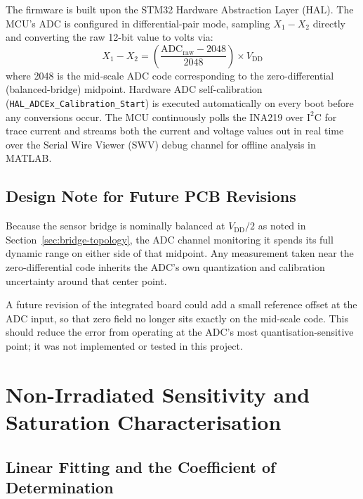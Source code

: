 \documentclass[12pt,a4paper]{article}
\begin{document}
The firmware is built upon the STM32 Hardware Abstraction Layer (HAL). The MCU's ADC is configured in differential-pair mode, sampling \(X_1 - X_2\) directly and converting the raw 12-bit value to volts via:
\begin{equation}
X_1 - X_2 = \left( \frac{\text{ADC}_{\text{raw}} - 2048}{2048} \right) \times V_{\text{DD}}
\label{eq:adcconv}
\end{equation}
where 2048 is the mid-scale ADC code corresponding to the zero-differential (balanced-bridge) midpoint. Hardware ADC self-calibration (\texttt{HAL\_ADCEx\_Calibration\_Start}) is executed automatically on every boot before any conversions occur. The MCU continuously polls the INA219 over \(\text{I}^2\text{C}\) for trace current and streams both the current and voltage values out in real time over the Serial Wire Viewer (SWV) debug channel for offline analysis in MATLAB. 


\subsection{Design Note for Future PCB Revisions}
\label{sec:future-pcb-note}

Because the sensor bridge is nominally balanced at \(V_{\text{DD}}/2\) as noted in Section~\ref{sec:bridge-topology}, the ADC channel monitoring it spends its full dynamic range on either side of that midpoint. Any measurement taken near the zero-differential code inherits the ADC's own quantization and calibration uncertainty around that center point.

A future revision of the integrated board could add a small reference offset at the ADC input, so that zero field no longer sits exactly on the mid-scale code. This should reduce the error from operating at the ADC's most quantisation-sensitive point; it was not implemented or tested in this project.




\section{Non-Irradiated Sensitivity and Saturation Characterisation}
\label{sec:nonirr-characterisation}

\subsection{Linear Fitting and the Coefficient of Determination}
\label{sec:fitting}
 
\end{document}
